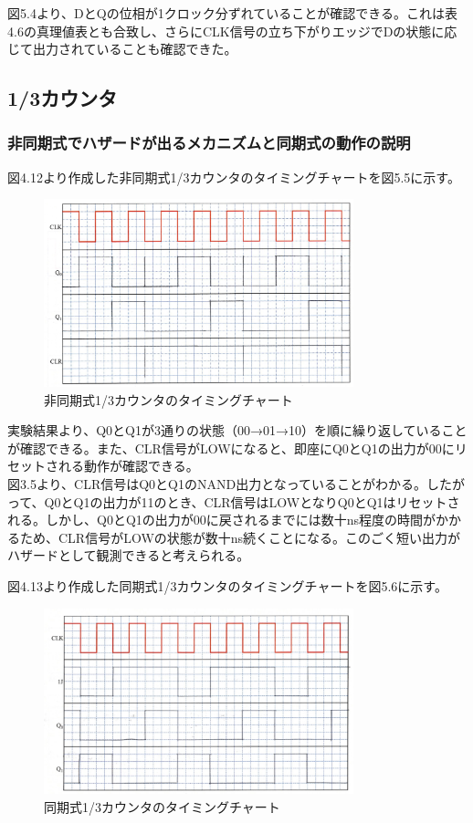 \documentclass{jlreq}
\numberwithin{equation}{section}
\begin{document}
図5.4より、DとQの位相が1クロック分ずれていることが確認できる。これは表4.6の真理値表とも合致し、さらにCLK信号の立ち下がりエッジでDの状態に応じて出力されていることも確認できた。

\subsection{1/3カウンタ}
\subsubsection{非同期式でハザードが出るメカニズムと同期式の動作の説明}

図4.12より作成した非同期式1/3カウンタのタイミングチャートを図5.5に示す。

\begin{figure}[H]
  \centering
  \includegraphics[width=0.8\textwidth]{assets/hidoukichart.png}
  \caption{非同期式1/3カウンタのタイミングチャート}
\end{figure}

実験結果より、Q0とQ1が3通りの状態（00→01→10）を順に繰り返していることが確認できる。また、CLR信号がLOWになると、即座にQ0とQ1の出力が00にリセットされる動作が確認できる。\\

図3.5より、CLR信号はQ0とQ1のNAND出力となっていることがわかる。したがって、Q0とQ1の出力が11のとき、CLR信号はLOWとなりQ0とQ1はリセットされる。しかし、Q0とQ1の出力が00に戻されるまでには数十ns程度の時間がかかるため、CLR信号がLOWの状態が数十ns続くことになる。このごく短い出力がハザードとして観測できると考えられる。

図4.13より作成した同期式1/3カウンタのタイミングチャートを図5.6に示す。

\begin{figure}[H]
  \centering
  \includegraphics[width=0.8\textwidth]{assets/doukichart.png}
  \caption{同期式1/3カウンタのタイミングチャート}
\end{figure}
\end{document}
